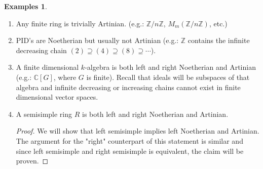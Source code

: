 \documentclass{tufte-handout} %
\theoremstyle{definition}
\newtheorem{exmps}[thm]{Examples}
\theoremstyle{remark}
\newcommand{\Z}{\mathbb{Z}}
\renewcommand{\C}{\mathbb{C}}
\begin{document}
\begin{exmps}
	\begin{enumerate}
		\item Any finite ring is trivially Artinian. (e.g.: $\Z/n\Z$, $M_m(\Z/n\Z)$, etc.)
		\item PID's are Noetherian but usually not Artinian (e.g.: $\Z$ contains the infinite decreasing chain $(2) \supseteq (4) \supseteq (8) \supseteq \cdots $).
		\item A finite dimensional $k$-algebra is both left and right Noetherian and Artinian (e.g.: $\C[G]$, where $G$ is finite). Recall that ideals will be subspaces of that algebra and infinite decreasing or increasing chains cannot exist in finite dimensional vector spaces.
		\item A semisimple ring $R$ is both left and right Noetherian and Artinian.
		\begin{proof}
			We will show that left semisimple implies left Noetherian and Artinian. The argument for the "right" counterpart of this statement is similar and since left semisimple and right semisimple is equivalent, the claim will be proven.
			

\end{proof}
\end{enumerate}
\end{exmps}
\end{document}
